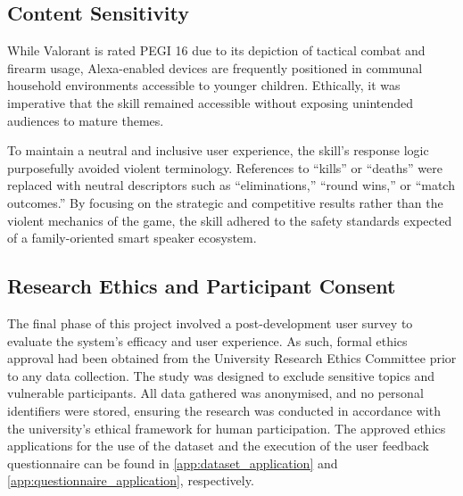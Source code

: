 \subsection{Content Sensitivity}
While Valorant is rated PEGI 16 due to its depiction of tactical combat and firearm usage, Alexa-enabled devices are frequently positioned in communal household environments accessible to younger children. Ethically, it was imperative that the skill remained accessible without exposing unintended audiences to mature themes.

To maintain a neutral and inclusive user experience, the skill's response logic purposefully avoided violent terminology. References to ``kills'' or ``deaths'' were replaced with neutral descriptors such as ``eliminations,'' ``round wins,'' or ``match outcomes.'' By focusing on the strategic and competitive results rather than the violent mechanics of the game, the skill adhered to the safety standards expected of a family-oriented smart speaker ecosystem.

\subsection{Research Ethics and Participant Consent}
The final phase of this project involved a post-development user survey to evaluate the system's efficacy and user experience. As such, formal ethics approval had been obtained from the University Research Ethics Committee prior to any data collection. The study was designed to exclude sensitive topics and vulnerable participants. All data gathered was anonymised, and no personal identifiers were stored, ensuring the research was conducted in accordance with the university's ethical framework for human participation. The approved ethics applications for the use of the dataset and the execution of the user feedback questionnaire can be found in \autoref{app:dataset_application} and \autoref{app:questionnaire_application}, respectively.